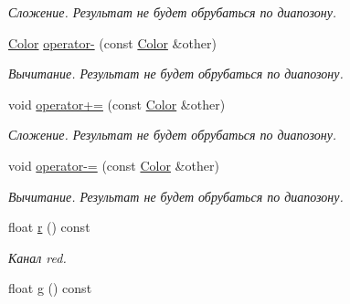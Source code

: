 \begin{DoxyCompactItemize}
\begin{DoxyCompactList}\small\item\em Сложение. Результат не будет обрубаться по диапозону. \end{DoxyCompactList}\item 
\hypertarget{class_tempest_1_1_color_aa00513416acac8489d70fd27b78b81af}{\hyperlink{class_tempest_1_1_color}{Color} \hyperlink{class_tempest_1_1_color_aa00513416acac8489d70fd27b78b81af}{operator-\/} (const \hyperlink{class_tempest_1_1_color}{Color} \&other)}\label{class_tempest_1_1_color_aa00513416acac8489d70fd27b78b81af}

\begin{DoxyCompactList}\small\item\em Вычитание. Результат не будет обрубаться по диапозону. \end{DoxyCompactList}\item 
\hypertarget{class_tempest_1_1_color_ac283f565588e93af17866d357827fa87}{void \hyperlink{class_tempest_1_1_color_ac283f565588e93af17866d357827fa87}{operator+=} (const \hyperlink{class_tempest_1_1_color}{Color} \&other)}\label{class_tempest_1_1_color_ac283f565588e93af17866d357827fa87}

\begin{DoxyCompactList}\small\item\em Сложение. Результат не будет обрубаться по диапозону. \end{DoxyCompactList}\item 
\hypertarget{class_tempest_1_1_color_aa058fd5b4366eaaf053d0cda3837c9a5}{void \hyperlink{class_tempest_1_1_color_aa058fd5b4366eaaf053d0cda3837c9a5}{operator-\/=} (const \hyperlink{class_tempest_1_1_color}{Color} \&other)}\label{class_tempest_1_1_color_aa058fd5b4366eaaf053d0cda3837c9a5}

\begin{DoxyCompactList}\small\item\em Вычитание. Результат не будет обрубаться по диапозону. \end{DoxyCompactList}\item 
\hypertarget{class_tempest_1_1_color_ad6d7d14e2251970ddc32a3845c2adc46}{float \hyperlink{class_tempest_1_1_color_ad6d7d14e2251970ddc32a3845c2adc46}{r} () const }\label{class_tempest_1_1_color_ad6d7d14e2251970ddc32a3845c2adc46}

\begin{DoxyCompactList}\small\item\em Канал red. \end{DoxyCompactList}\item 
\hypertarget{class_tempest_1_1_color_a7dd31a26074d75037eb72979d11f9a87}{float \hyperlink{class_tempest_1_1_color_a7dd31a26074d75037eb72979d11f9a87}{g} () const }\label{class_tempest_1_1_color_a7dd31a26074d75037eb72979d11f9a87}


\end{DoxyCompactItemize}
